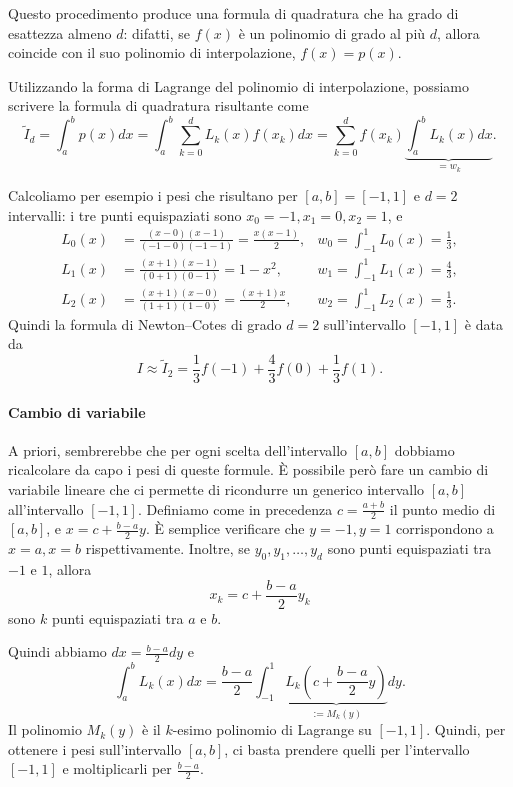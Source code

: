\documentclass[a4paper]{report}
\theoremstyle{definiton}
\theoremstyle{remark}
\begin{document}
Questo procedimento produce una formula di quadratura che ha grado di esattezza almeno $d$: difatti, se $f(x)$ è un polinomio di grado al più $d$, allora coincide con il suo polinomio di interpolazione, $f(x)=p(x)$.

Utilizzando la forma di Lagrange del polinomio di interpolazione, possiamo scrivere la formula di quadratura risultante come
\[
    \tilde{I}_d = \int_a^b p(x) dx = \int_a^b \sum_{k=0}^d L_k(x)f(x_k) dx = \sum_{k=0}^d f(x_k) \underbrace{\int_a^b L_k(x) dx}_{=w_k}.
\]

Calcoliamo per esempio i pesi che risultano per $[a,b]=[-1,1]$ e $d=2$ intervalli: i tre punti equispaziati sono $x_0=-1,x_1=0,x_2 = 1$, e 
\begin{align*}
L_0(x) &= \frac{(x-0)(x-1)}{(-1-0)(-1-1)} = \frac{x(x-1)}{2}, & w_0 = \int_{-1}^1 L_0(x) = \frac13, \\
L_1(x) &= \frac{(x+1)(x-1)}{(0+1)(0-1)} = 1-x^2, & w_1 = \int_{-1}^1 L_1(x) = \frac43, \\
L_2(x) &= \frac{(x+1)(x-0)}{(1+1)(1-0)}  = \frac{(x+1)x}{2}, & w_2 = \int_{-1}^1 L_2(x) = \frac13.
\end{align*}
Quindi la formula di Newton--Cotes di grado $d=2$ sull'intervallo $[-1,1]$ è data da 
\[
I \approx \tilde{I}_2 = \frac{1}{3}f(-1) + \frac{4}{3}f(0) + \frac{1}{3}f(1).
\]

\paragraph{Cambio di variabile} A priori, sembrerebbe che per ogni scelta dell'intervallo $[a,b]$ dobbiamo ricalcolare da capo i pesi di queste formule. È possibile però fare un cambio di variabile lineare che ci permette di ricondurre un generico intervallo $[a,b]$ all'intervallo $[-1,1]$. Definiamo come in precedenza $c=\frac{a+b}{2}$ il punto medio di $[a,b]$, e $x = c + \frac{b-a}{2}y$. È semplice verificare che $y=-1,y=1$ corrispondono a $x=a,x=b$ rispettivamente. Inoltre, se $y_0,y_1,\dots,y_d$ sono punti equispaziati tra $-1$ e $1$, allora
\[
    x_k = c + \frac{b-a}{2}y_k
\]
sono $k$ punti equispaziati tra $a$ e $b$.

Quindi abbiamo $dx = \frac{b-a}{2}dy$ e 
\[
\int_{a}^b L_k(x)dx = \frac{b-a}{2}\int_{-1}^1 \underbrace{L_k\left(c+\frac{b-a}{2}y\right)}_{:=M_k(y)} dy.
\]
Il polinomio $M_k(y)$ è il $k$-esimo polinomio di Lagrange su $[-1,1]$. Quindi, per ottenere i pesi sull'intervallo $[a,b]$, ci basta prendere quelli per l'intervallo $[-1,1]$ e moltiplicarli per $\frac{b-a}{2}$.
\end{document}
